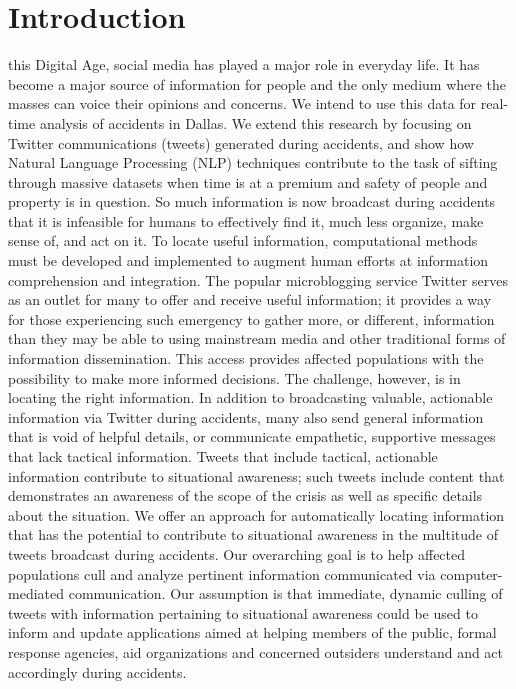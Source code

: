 \documentclass[journal]{IEEEtran}
\begin{document}
\section{Introduction}
% 
% 
% 
% 
 this Digital Age, social media has played a major role in everyday life. It has become a major source of information for people and the only medium where the masses can voice their opinions and concerns. We intend to use this data for real-time analysis of accidents in Dallas. We extend this research by focusing on Twitter communications (tweets) generated during accidents, and show how Natural Language Processing (NLP) techniques contribute to the task of sifting through massive datasets when time is at a premium and safety of people and property is in question. So much information is now broadcast during accidents that it is infeasible for humans to effectively find it, much less organize, make sense of, and act on it. To locate useful information, computational methods must be developed and implemented to augment human efforts at information comprehension and integration. The popular microblogging service Twitter serves as an outlet for many to offer and receive useful information; it provides a way for those experiencing such emergency to gather more, or different, information than they may be able to using mainstream media and other traditional forms of information dissemination. This access provides affected populations with the possibility to make more informed decisions. The challenge, however, is in locating the right information. In addition to broadcasting valuable, actionable information via Twitter during accidents, many also send general information that is void of helpful details, or communicate empathetic, supportive messages that lack tactical information. Tweets that include tactical, actionable information contribute to situational awareness; such tweets include content that demonstrates an awareness of the scope of the crisis as well as specific details about the situation. We offer an approach for automatically locating information that has the potential to contribute to situational awareness in the multitude of tweets broadcast during accidents. Our overarching goal is to help affected populations cull and analyze pertinent information communicated via computer-mediated communication. Our assumption is that immediate, dynamic culling of tweets with information pertaining to situational awareness could be used to inform and update applications aimed at helping members of the public, formal response agencies, aid organizations and concerned outsiders understand and act accordingly during accidents.
\end{document}
